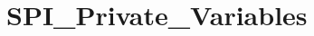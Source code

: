 \hypertarget{group___s_p_i___private___variables}{}\section{S\+P\+I\+\_\+\+Private\+\_\+\+Variables}
\label{group___s_p_i___private___variables}
